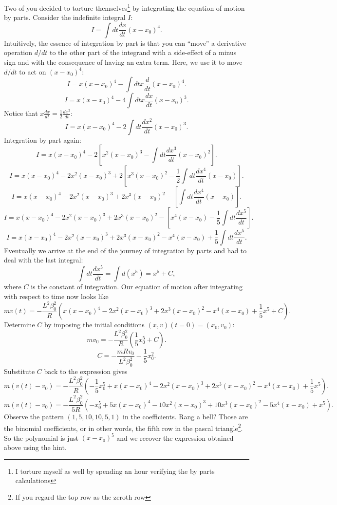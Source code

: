 \documentclass[a4paper]{article}
\begin{document}
Two of you decided to torture themselves\footnote{I torture myself as well by spending an hour verifying the by parts calculations} by integrating the equation of motion by parts. 
Consider the indefinite integral $I$:
 \[
     I = \int dt \frac{dx}{dt} (x-x_0)^4 
.\] 
Intuitively, the essence of integration by part is that you can ``move'' a derivative operation $d/dt$ to the other part of the integrand with a side-effect of a minus sign and with the consequence of having an extra term. Here, we use it to move $d/dt$ to act on $(x-x_0)^4$:
\[
    I = x(x-x_0)^4 - \int dt x \frac{d}{dt} (x-x_0)^4
.\] 
\[
    I = x(x-x_0)^4 - 4 \int dt x \frac{dx}{dt} (x-x_0)^3 
.\] 
Notice that $x \frac{dx}{dt} = \frac{1}{2} \frac{dx^2}{dt}$:
\[
    I = x(x-x_0)^4 - 2 \int dt \frac{dx^2}{dt} (x-x_0)^3 
.\]
Integration by part again:
\[
    I = x(x-x_0)^4 - 2 \left[ x^2 (x-x_0)^3 -  \int dt \frac{dx^3}{dt} (x-x_0)^2 \right]
.\] 
\[
    I = x(x-x_0)^4 - 2 x^2 (x-x_0)^3 + 2 \left[ x^3 (x-x_0)^2 - \frac{1}{2} \int dt \frac{dx^4}{dt} (x-x_0) \right]
.\] 
\[
    I = x(x-x_0)^4 - 2 x^2 (x-x_0)^3 + 2  x^3 (x-x_0)^2 - \left[ \int dt \frac{dx^4}{dt} (x-x_0) \right]
.\] 
\[
    I = x(x-x_0)^4 - 2 x^2 (x-x_0)^3 + 2  x^3 (x-x_0)^2 - \left[ x^4 (x-x_0) - \frac{1}{5}\int dt \frac{dx^5}{dt} \right]
.\]
\[
    I = x(x-x_0)^4 - 2 x^2 (x-x_0)^3 + 2  x^3 (x-x_0)^2 - x^4 (x-x_0) + \frac{1}{5}\int dt \frac{dx^5}{dt} 
.\] 
Eventually we arrive at the end of the journey of integration by parts and had to deal with the last integral:
\[
    \int dt \frac{dx^5}{dt} = \int d(x^5) = x^5 + C 
,\]
where $C$ is the constant of integration.
Our equation of motion after integrating with respect to time now looks like
\[
    m v(t) = -\frac{L^2 \beta_0^2}{R} \left(x(x-x_0)^4 - 2 x^2 (x-x_0)^3 + 2  x^3 (x-x_0)^2 - x^4 (x-x_0) + \frac{1}{5} x^5 + C \right)
.\] 
Determine $C$ by imposing the initial conditions $(x,v)(t=0) = (x_0, v_0)$:
\[
    m v_0 = -\frac{L^2 \beta_0^2}{R} \left( \frac{1}{5} x_0^5 + C\right) 
.\] 
\[
C = - \frac{mRv_0}{L^2\beta_0^2} - \frac{1}{5} x_0^2
.\] 
Substitute $C$ back to the expression gives
 \[
     m (v(t)-v_0) = -\frac{L^2 \beta_0^2}{R} \left(-\frac{1}{5}x_0^5 + x(x-x_0)^4 - 2 x^2 (x-x_0)^3 + 2  x^3 (x-x_0)^2 - x^4 (x-x_0) + \frac{1}{5} x^5  \right)
.\] 
\[
     m (v(t)-v_0) = -\frac{L^2 \beta_0^2}{5R} \left(-x_0^5 + 5 x(x-x_0)^4 - 10 x^2 (x-x_0)^3 + 10 x^3 (x-x_0)^2 - 5 x^4 (x-x_0) +  x^5  \right)
.\] 
Observe the pattern $(1, 5, 10, 10, 5, 1)$ in the coefficients. Rang a bell? Those are the binomial coefficients, or in other words, the fifth row in the pascal triangle\footnote{If you regard the top row as the zeroth row}. So the polynomial is just $(x-x_0)^5$ and we recover the expression obtained above using the hint.
\end{document}

